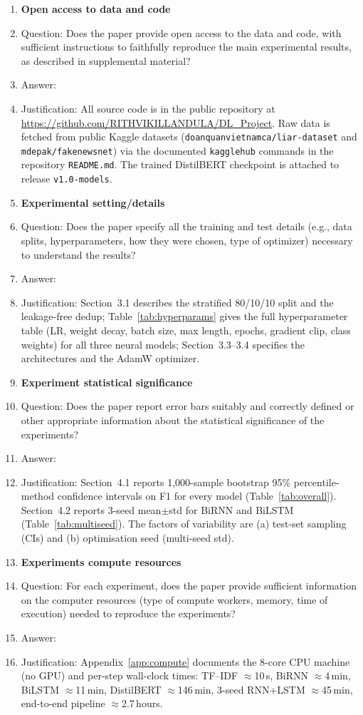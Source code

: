 \begin{enumerate}
\item {\bf Open access to data and code}
    \item[] Question: Does the paper provide open access to the data and code, with sufficient instructions to faithfully reproduce the main experimental results, as described in supplemental material?
    \item[] Answer: \answerYes{}
    \item[] Justification: All source code is in the public repository at \url{https://github.com/RITHVIKILLANDULA/DL_Project}. Raw data is fetched from public Kaggle datasets (\texttt{doanquanvietnamca/liar-dataset} and \texttt{mdepak/fakenewsnet}) via the documented \texttt{kagglehub} commands in the repository \texttt{README.md}. The trained DistilBERT checkpoint is attached to release \texttt{v1.0-models}.

\item {\bf Experimental setting/details}
    \item[] Question: Does the paper specify all the training and test details (e.g., data splits, hyperparameters, how they were chosen, type of optimizer) necessary to understand the results?
    \item[] Answer: \answerYes{}
    \item[] Justification: Section~3.1 describes the stratified 80/10/10 split and the leakage-free dedup; Table~\ref{tab:hyperparams} gives the full hyperparameter table (LR, weight decay, batch size, max length, epochs, gradient clip, class weights) for all three neural models; Section~3.3--3.4 specifies the architectures and the AdamW optimizer.

\item {\bf Experiment statistical significance}
    \item[] Question: Does the paper report error bars suitably and correctly defined or other appropriate information about the statistical significance of the experiments?
    \item[] Answer: \answerYes{}
    \item[] Justification: Section~4.1 reports 1{,}000-sample bootstrap 95\% percentile-method confidence intervals on F1 for every model (Table~\ref{tab:overall}). Section~4.2 reports 3-seed mean$\pm$std for BiRNN and BiLSTM (Table~\ref{tab:multiseed}). The factors of variability are (a) test-set sampling (CIs) and (b) optimisation seed (multi-seed std).

\item {\bf Experiments compute resources}
    \item[] Question: For each experiment, does the paper provide sufficient information on the computer resources (type of compute workers, memory, time of execution) needed to reproduce the experiments?
    \item[] Answer: \answerYes{}
    \item[] Justification: Appendix~\ref{app:compute} documents the 8-core CPU machine (no GPU) and per-step wall-clock times: TF--IDF $\approx$10\,s, BiRNN $\approx$4\,min, BiLSTM $\approx$11\,min, DistilBERT $\approx$146\,min, 3-seed RNN+LSTM $\approx$45\,min, end-to-end pipeline $\approx$2.7\,hours.


\end{enumerate}
